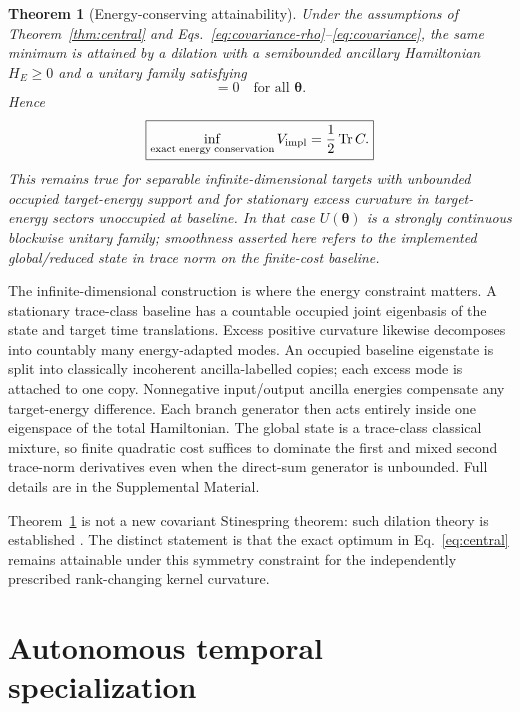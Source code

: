 \documentclass[aps,pra,preprint,nofootinbib]{revtex4-2}
\newtheorem{theorem}{Theorem}
\newcommand{\Tr}{\operatorname{Tr}}
\newcommand{\Vimpl}{V_{\rm impl}}
\newcommand{\Cker}{C}
\newcommand{\HT}{H_T}
\begin{document}
\begin{theorem}[Energy-conserving attainability]
\label{thm:energy}
Under the assumptions of Theorem~\ref{thm:central} and Eqs.~\eqref{eq:covariance-rho}--\eqref{eq:covariance}, the same minimum is attained by a dilation with a semibounded ancillary Hamiltonian $H_E\ge0$ and a unitary family satisfying
\begin{equation}
 [U(\bm\theta),\HT\otimes I+I\otimes H_E]=0
 \quad\text{for all }\bm\theta.
 \label{eq:energyconserve}
\end{equation}
Hence
\begin{equation}
 \boxed{
 \inf_{\rm exact\;energy\;conservation}\Vimpl
 =\frac12\Tr\Cker.
 }
 \label{eq:energyminimum}
\end{equation}
This remains true for separable infinite-dimensional targets with unbounded occupied target-energy support and for stationary excess curvature in target-energy sectors unoccupied at baseline. In that case $U(\bm\theta)$ is a strongly continuous blockwise unitary family; smoothness asserted here refers to the implemented global/reduced state in trace norm on the finite-cost baseline.
\end{theorem}

The infinite-dimensional construction is where the energy constraint matters. A stationary trace-class baseline has a countable occupied joint eigenbasis of the state and target time translations. Excess positive curvature likewise decomposes into countably many energy-adapted modes. An occupied baseline eigenstate is split into classically incoherent ancilla-labelled copies; each excess mode is attached to one copy. Nonnegative input/output ancilla energies compensate any target-energy difference. Each branch generator then acts entirely inside one eigenspace of the total Hamiltonian. The global state is a trace-class classical mixture, so finite quadratic cost suffices to dominate the first and mixed second trace-norm derivatives even when the direct-sum generator is unbounded. Full details are in the Supplemental Material.

Theorem~\ref{thm:energy} is not a new covariant Stinespring theorem: such dilation theory is established \cite{Scutaru1979}. The distinct statement is that the exact optimum in Eq.~\eqref{eq:central} remains attainable under this symmetry constraint for the independently prescribed rank-changing kernel curvature.

\section{Autonomous temporal specialization}
\end{document}
